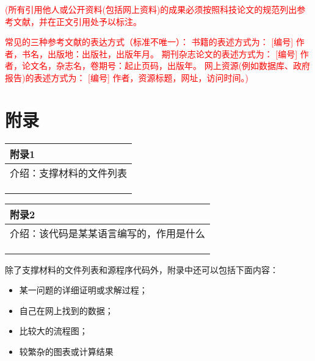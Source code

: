 \documentclass{my_paper}
\begin{document}
\begin{center}
\end{center}
\textcolor{red}{(所有引用他人或公开资料(包括网上资料)的成果必须按照科技论文的规范列出参考文献，并在正文引用处予以标注。}

\textcolor{red}{常见的三种参考文献的表达方式（标准不唯一）：
书籍的表述方式为： [编号] 作者，书名，出版地：出版社，出版年月。
期刊杂志论文的表述方式为： [编号] 作者，论文名，杂志名，卷期号：起止页码，出版年。
网上资源(例如数据库、政府报告)的表述方式为： [编号] 作者，资源标题，网址，访问时间。)}
\newpage
\section{附录}

\begin{table}[htbp]
    \centering
    \begin{tabular}{|p{14.0cm}|}
    \hline
    \textbf{附录1} \\ %
    \hline
    介绍：支撑材料的文件列表  \\ 
    \\
    \\
    \\
    \hline
    \end{tabular}
\end{table}

\begin{table}[htbp]
    \centering
    \begin{tabular}{|p{14.0cm}|}
    \hline
    \textbf{附录2} \\ %
    \hline
    介绍：该代码是某某语言编写的，作用是什么   \\ 
    \\
    \\
    \\
    \hline
    \end{tabular}
\end{table}

除了支撑材料的文件列表和源程序代码外，附录中还可以包括下面内容：
\begin{itemize}
\item 某一问题的详细证明或求解过程；
\item 自己在网上找到的数据；
\item 比较大的流程图；
\item 较繁杂的图表或计算结果
\end{itemize}
\end{document}

